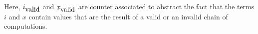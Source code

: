Here, ${i}_{\mbox{valid}}$ and ${x}_{\mbox{valid}}$ are counter associated to abstract the fact that
the terms $i$ and $x$ contain values that are the result of a valid or an invalid chain of computations.

%
%


%
%
%
%
%
%
%
%



